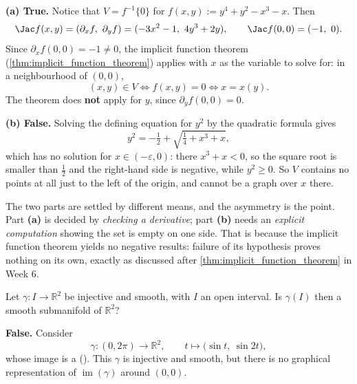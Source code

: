 \begin{answer}
\textbf{(a) True.} Notice that $V = f^{-1}\{0\}$ for $f(x,y) := y^4+y^2-x^3-x$. Then
\[\Jac f(x,y) = (\partial_xf,\ \partial_yf) = (-3x^2-1,\ 4y^3+2y), \qquad \Jac f(0,0) = (-1,\ 0).\]
Since $\partial_xf(0,0) = -1 \neq 0$, the implicit function theorem
(\cref{thm:implicit_function_theorem}) applies with $x$ as the variable to solve for: in a
neighbourhood of $(0,0)$,
\[(x,y) \in V \iff f(x,y) = 0 \iff x = x(y).\]
The theorem does \textbf{not} apply for $y$, since $\partial_yf(0,0) = 0$.

\textbf{(b) False.} Solving the defining equation for $y^2$ by the quadratic formula gives
\[y^2 = -\tfrac12 + \sqrt{\tfrac14 + x^3 + x},\]
which has no solution for $x \in (-\varepsilon,0)$: there $x^3+x < 0$, so the square root is
smaller than $\tfrac12$ and the right-hand side is negative, while $y^2 \geq 0$. So $V$ contains
no points at all just to the left of the origin, and cannot be a graph over $x$ there.
\end{answer}

\begin{ainote}
The two parts are settled by different means, and the asymmetry is the point. Part \textbf{(a)}
is decided by \emph{checking a derivative}; part \textbf{(b)} needs an \emph{explicit
computation} showing the set is empty on one side. That is because the implicit function theorem
yields no negative results: failure of its hypothesis proves nothing on its own, exactly as
discussed after \cref{thm:implicit_function_theorem} in Week 6.
\end{ainote}

\begin{question}
\label{q:week08_q7}
Let $\gamma : I \to \mathbb{R}^2$ be injective and smooth, with $I$ an open interval. Is
$\gamma(I)$ then a smooth submanifold of $\mathbb{R}^2$?
\end{question}

\begin{answer}
\textbf{False.} Consider
\[\gamma : (0,2\pi) \to \mathbb{R}^2, \qquad t \mapsto \big(\sin t,\ \sin 2t\big),\]
whose image is a  (). This $\gamma$ is injective and
smooth, but there is no graphical representation of $\operatorname{im}(\gamma)$ around $(0,0)$.
\end{answer}

\begin{center}
\end{center}


